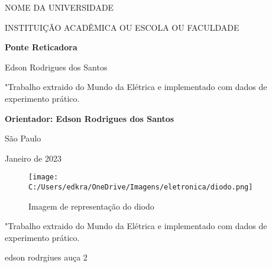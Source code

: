 \documentclass[a4paper,12pt]{article}
\begin{document}
\begin{titlepage}

\addtolength{\topmargin}{1.5cm}

\setlength{\baselineskip}{1.4\baselineskip}

\begin{center}
{\large{NOME DA UNIVERSIDADE}}

{\large{INSTITUIÇÃO ACADÊMICA OU ESCOLA OU FACULDADE}}

\end{center}
\vspace{2cm}
\begin{center}
{\Large\textbf{Ponte Reticadora}}
\end{center}

\vspace{1.5cm}

\begin{center}
{\Large{Edson Rodrigues dos Santos}}
\end{center}

\vspace{2cm}

\begin{flushright}

\begin{minipage}{10cm}

\hrulefill

"Trabalho extraido do Mundo da Elétrica e implementado com dados de experimento prático.

\hrulefill

{\textbf{Orientador: Edson Rodrigues dos Santos}}

\end{minipage}
\end{flushright}

\setlength{\baselineskip}{0.7\baselineskip}


\vfill

\begin{center}
São Paulo

Janeiro de 2023
\end{center}

\end{titlepage}
\noindent

\vspace{.07cm}
\begin{figure}[h]
\centering
	\texttt{[image: C:/Users/edkra/OneDrive/Imagens/eletronica/diodo.png]}
	\label{ConduçãoDiodo}
	\caption{Imagem de representação do diodo}	
\end{figure}

\begin{center}
\hrulefill

"Trabalho extraido do Mundo da Elétrica e implementado com dados de experimento prático.

\hrulefill
 edson rodrgiues auça 2

\end{center}	
\end{document}

